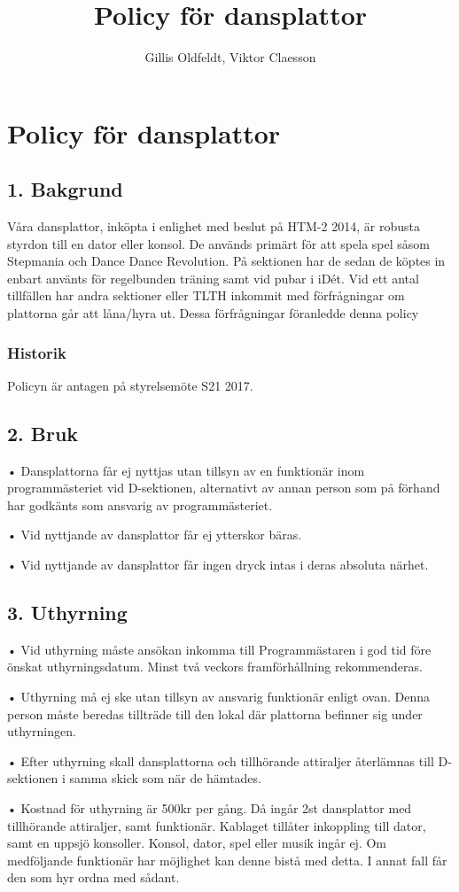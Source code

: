 \documentclass{dsekkallelse}
\title{Policy för dansplattor}
\author{Gillis Oldfeldt, Viktor Claesson}
\begin{document}
\section{Policy för dansplattor}

\subsection{1. Bakgrund}
Våra dansplattor, inköpta i enlighet med beslut på HTM-2 2014, är robusta styrdon till en dator
eller konsol. De används primärt för att spela spel såsom Stepmania och Dance Dance Revolution. På sektionen har de sedan de köptes in enbart använts för regelbunden träning samt vid
pubar i iDét. Vid ett antal tillfällen har andra sektioner eller TLTH inkommit med förfrågningar
om plattorna går att låna/hyra ut. Dessa förfrågningar föranledde denna policy

\subsubsection{Historik}
Policyn är antagen på styrelsemöte S21 2017. 

\subsection{2. Bruk}
• Dansplattorna får ej nyttjas utan tillsyn av en funktionär inom programmästeriet vid D-sektionen, alternativt av annan person som på förhand har godkänts som ansvarig av
programmästeriet.


• Vid nyttjande av dansplattor får ej ytterskor bäras. 


• Vid nyttjande av dansplattor får ingen dryck intas i deras absoluta närhet.

\subsection{3. Uthyrning}
• Vid uthyrning måste ansökan inkomma till Programmästaren i god tid före önskat uthyrningsdatum. Minst två veckors framförhållning rekommenderas.

• Uthyrning må ej ske utan tillsyn av ansvarig funktionär enligt ovan. Denna person måste beredas tillträde till den lokal där plattorna befinner sig under uthyrningen.

• Efter uthyrning skall dansplattorna och tillhörande attiraljer återlämnas till D-sektionen
i samma skick som när de hämtades.

• Kostnad för uthyrning är 500kr per gång. Då ingår 2st dansplattor med tillhörande attiraljer, samt funktionär. Kablaget tillåter inkoppling till dator, samt en uppsjö konsoller.
Konsol, dator, spel eller musik ingår ej. Om medföljande funktionär har möjlighet kan
denne bistå med detta. I annat fall får den som hyr ordna med sådant.
\end{document}
